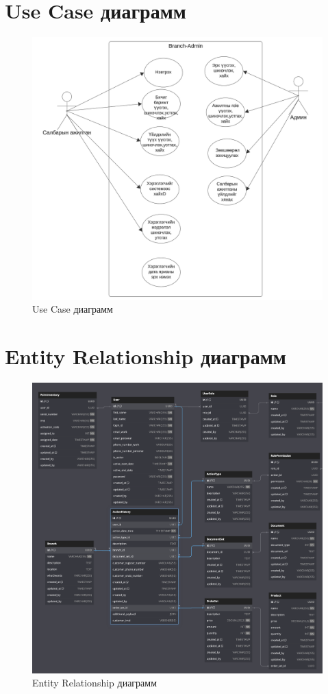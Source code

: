 \pagebreak

\section{Use Case диаграмм}
\begin{figure}[h!]
	\centering
	\includegraphics[width=15cm]{images/usecase-diagram.png}
	\caption{Use Case диаграмм}
	\label{fig:usecase-image}
\end{figure}
\pagebreak

\section{Entity Relationship диаграмм}
\begin{figure}[h!]
	\centering
	\includegraphics[width=15cm]{images/er-diagram.png}
	\caption{Entity Relationship диаграмм}
	\label{fig:er-image}
\end{figure}